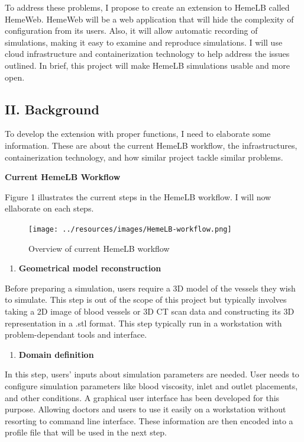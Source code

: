 \documentclass[]{article}
\providecommand{\tightlist}{%
  \setlength{\itemsep}{0pt}\setlength{\parskip}{0pt}}
\begin{document}
To address these problems, I propose to create an extension to HemeLB
called HemeWeb. HemeWeb will be a web application that will hide the
complexity of configuration from its users. Also, it will allow
automatic recording of simulations, making it easy to examine and
reproduce simulations. I will use cloud infrastructure and
containerization technology to help address the issues outlined. In
brief, this project will make HemeLB simulations usable and more open.

\subsection{II. Background}\label{ii.-background}

To develop the extension with proper functions, I need to elaborate some
information. These are about the current HemeLB workflow, the
infrastructures, containerization technology, and how similar project
tackle similar problems.

\textbf{Current HemeLB Workflow}

Figure 1 illustrates the current steps in the HemeLB workflow. I will
now ellaborate on each steps.

\begin{figure}[H]
\centering
\texttt{[image: ../resources/images/HemeLB-workflow.png]}
\caption{Overview of current HemeLB workflow}
\end{figure}

\begin{enumerate}
\def\labelenumi{\arabic{enumi}.}
\tightlist
\item
  \textbf{Geometrical model reconstruction}
\end{enumerate}

Before preparing a simulation, users require a 3D model of the vessels
they wish to simulate. This step is out of the scope of this project but
typically involves taking a 2D image of blood vessels or 3D CT scan data
and constructing its 3D representation in a .stl format. This step
typically run in a workstation with problem-dependant tools and
interface.

\begin{enumerate}
\def\labelenumi{\arabic{enumi}.}
\setcounter{enumi}{1}
\tightlist
\item
  \textbf{Domain definition}
\end{enumerate}

In this step, users' inputs about simulation parameters are needed. User
needs to configure simulation parameters like blood viscosity, inlet and
outlet placements, and other conditions. A graphical user interface has
been developed for this purpose. Allowing doctors and users to use it
easily on a workstation without resorting to command line interface.
These information are then encoded into a profile file that will be used
in the next step.
\end{document}
